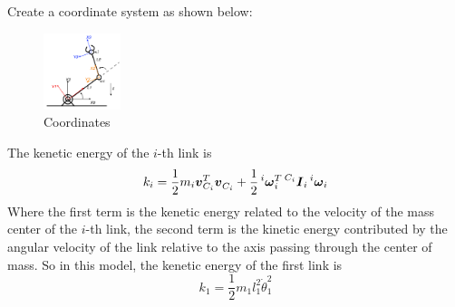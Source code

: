 \documentclass[a4paper]{article}
\begin{document}
Create a coordinate system as shown below:
\begin{figure}[H]
\centering
\includegraphics[width = 0.2\textwidth]{pic/cor.png}
\caption{Coordinates}
\end{figure}
\par
The kenetic energy of the $i$-th link is 
\begin{equation}
k_i = \frac{1}{2} m_i \boldsymbol{v}_{C_i}^T \boldsymbol{v}_{C_i}^{} + \frac12 \prescript{i}{} {\boldsymbol{\omega}}_i^T \prescript{C_i}{}{\boldsymbol{I}_i} \prescript{i}{}{\boldsymbol{\omega}}_i
\label{kenetics}
\end{equation}
Where the first term is the kenetic energy related to the velocity of the mass center of the $i$-th link, the second term is the kinetic energy contributed by the angular velocity of the link relative to the axis passing through the center of mass. So in this model, the kenetic energy of the first link is 
$$
k_1 = \frac 12 m_1l_1^2\dot{\theta}_1^2
$$
\end{document}
